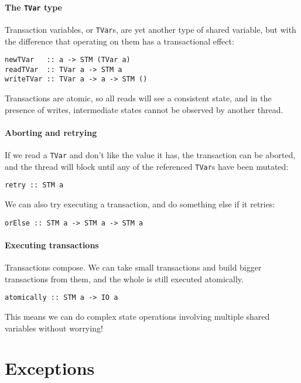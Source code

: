 \paragraph{The \texttt{TVar} type}
Transaction variables, or \verb|TVar|s, are yet another type of shared variable,
but with the difference that operating on them has a transactional effect:

\begin{verbatim}
newTVar   :: a -> STM (TVar a)
readTVar  :: TVar a -> STM a
writeTVar :: TVar a -> a -> STM ()
\end{verbatim}

Transactions are atomic, so all reads will see a consistent state, and
in the presence of writes, intermediate states cannot be observed by
another thread.

\paragraph{Aborting and retrying}
If we read a \verb|TVar| and don't like the value it has, the
transaction can be aborted, and the thread will block until any of the
referenced \verb|TVar|s have been mutated:

\begin{verbatim}
retry :: STM a
\end{verbatim}

We can also try executing a transaction, and do something else if it
retries:

\begin{verbatim}
orElse :: STM a -> STM a -> STM a
\end{verbatim}

\paragraph{Executing transactions}
Transactions compose.  We can take small transactions and build bigger
transactions from them, and the whole is still executed atomically.

\begin{verbatim}
atomically :: STM a -> IO a
\end{verbatim}

This means we can do complex state operations involving multiple shared
variables without worrying!

\section{Exceptions}
\label{sec:concurrent_haskell-exc}

